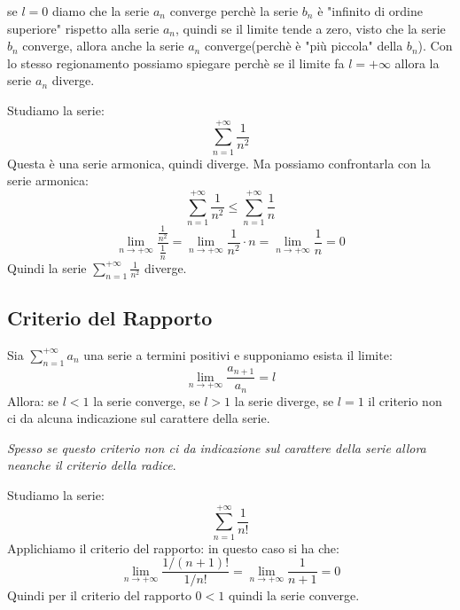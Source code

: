             \begin{approfondimento}
                se $l=0$ diamo che la serie $a_n$ converge perchè la serie $b_n$ è "infinito di ordine superiore" rispetto alla serie $a_n$, quindi se il limite tende a zero, visto che la serie $b_n$ converge, allora anche la serie $a_n$ converge(perchè è "più piccola" della $b_n$). Con lo stesso regionamento possiamo spiegare perchè se il limite fa $l=+\infty$ allora la serie $a_n$ diverge.
            \end{approfondimento}
        \begin{esempio}
            Studiamo la serie:
                \[ \sum_{n=1}^{+\infty} \frac{1}{n^2} \]
            Questa è una serie armonica, quindi diverge. Ma possiamo confrontarla con la serie armonica:
                \[ \sum_{n=1}^{+\infty} \frac{1}{n^2} \leq \sum_{n=1}^{+\infty} \frac{1}{n} \]
                    \begin{equation}
                        \lim_{n \to +\infty} \frac{\frac{1}{n^2}}{\frac{1}{n}} = \lim_{n \to +\infty} \frac{1}{n^2} \cdot n  = \lim_{n \to +\infty} \frac{1}{n}=0
                    \end{equation}
            Quindi la serie $\sum_{n=1}^{+\infty} \frac{1}{n^2}$ diverge.
        \end{esempio}
    \subsection{Criterio del Rapporto}
             \begin{definizione}
                    Sia \emph{$\sum_{n=1}^{+\infty}a_n$} una serie a termini positivi e supponiamo esista il limite:
                    \[ \lim_{n \to +\infty} \frac{a_{n+1}}{a_n} = l \]
                    Allora: se $l < 1$ la serie converge, se $l > 1$ la serie diverge, se $l = 1$ il criterio non ci da alcuna indicazione sul carattere della serie.
            \end{definizione}
                    \emph{Spesso se questo criterio non ci da indicazione sul carattere della serie allora neanche il criterio della radice}.
        \begin{esempio}
            Studiamo la serie:
                \[ \sum_{n=1}^{+\infty} \frac{1}{n!} \]
            Applichiamo il criterio del rapporto:
            in questo caso si ha che:
            \begin{equation} \lim_{n \to +\infty} \frac{1/(n+1)!}{1/n!} = \lim_{n \to +\infty} \frac{1}{n+1} = 0
            \end{equation}
            Quindi per il criterio del rapporto $0<1$ quindi la serie converge.
        \end{esempio}
